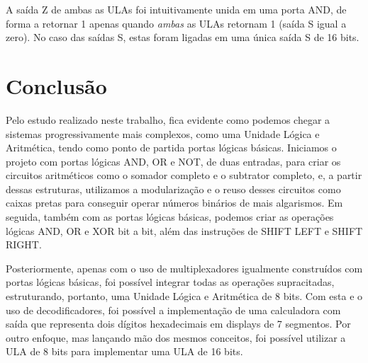 \documentclass[
	12pt,				%
	openright,			%
	twoside,			%
	a4paper,			%
	english,			%
	french,				%
	spanish,			%
	brazil,				%
	]{abntex2}
\begin{document}
A saída Z de ambas as ULAs foi intuitivamente unida em uma porta AND, de forma a retornar 1 apenas quando \textit{ambas} as ULAs retornam 1 (saída S igual a zero). No caso das saídas S, estas foram ligadas em uma única saída S de 16 bits.


\chapter*[Conclusão]{Conclusão}

Pelo estudo realizado neste trabalho, fica evidente como podemos chegar a sistemas progressivamente mais complexos, como uma Unidade Lógica e Aritmética, tendo como ponto de partida portas lógicas básicas. Iniciamos o projeto com portas lógicas AND, OR e NOT, de duas entradas, para criar os circuitos aritméticos como o somador completo e o subtrator completo, e, a partir dessas estruturas, utilizamos a modularização e o reuso desses circuitos como caixas pretas para conseguir operar números binários de mais algarismos. Em seguida, também com as portas lógicas básicas, podemos criar as operações lógicas AND, OR e XOR bit a bit, além das instruções de SHIFT LEFT e SHIFT RIGHT.

Posteriormente, apenas com o uso de multiplexadores igualmente construídos com portas lógicas básicas, foi possível integrar todas as operações supracitadas, estruturando, portanto, uma Unidade Lógica e Aritmética de 8 bits. Com esta e o uso de decodificadores, foi possível a implementação de uma calculadora com saída que representa dois dígitos hexadecimais em displays de 7 segmentos. Por outro enfoque, mas lançando mão dos mesmos conceitos, foi possível utilizar a ULA de 8 bits para implementar uma ULA de 16 bits.
\end{document}
